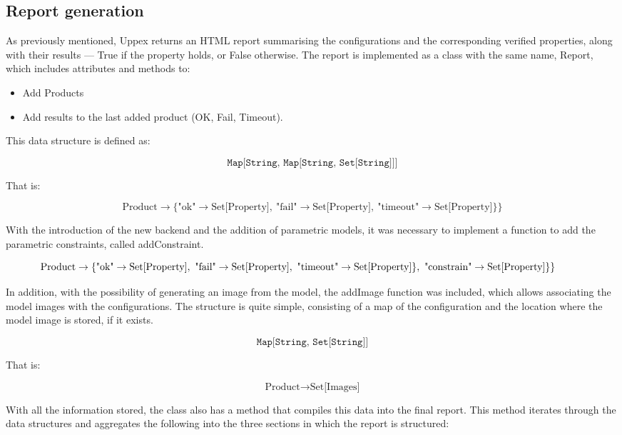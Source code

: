 \subsection{Report generation}

As previously mentioned, Uppex returns an HTML report summarising the configurations and the corresponding verified properties, along with their results — True if the property holds, or False otherwise. The report is implemented as a class with the same name, Report, which includes attributes and methods to:

\begin{itemize}
    \item Add Products

    \item Add results to the last added product (OK, Fail, Timeout).
\end{itemize}

This data structure is defined as:

\[
\texttt{Map[String, Map[String, Set[String]]]}
\]

That is:

\[
\text{Product} \rightarrow \{\text{"ok"} \rightarrow \text{Set[Property]}, \ \text{"fail"} \rightarrow \text{Set[Property]}, \ \text{"timeout"} \rightarrow \text{Set[Property]}\}\}
\]

With the introduction of the new backend and the addition of parametric models, it was necessary to implement a function to add the parametric constraints, called addConstraint.

\[
\hspace{-1cm}
\text{Product} \rightarrow \{\text{"ok"} \rightarrow \text{Set[Property]}, \ \text{"fail"} \rightarrow \text{Set[Property]}, \ \text{"timeout"} \rightarrow \text{Set[Property]}\}, \ \text{"constrain"} \rightarrow \text{Set[Property]}\}\}
\]

In addition, with the possibility of generating an image from the model, the addImage function was included, which allows associating the model images with the configurations. The structure is quite simple, consisting of a map of the configuration and the location where the model image is stored, if it exists.


\[
\texttt{Map[String, Set[String]]}
\]

That is:

\[
\text{Product} \rightarrow \text{Set[Images]}
\]

With all the information stored, the class also has a method that compiles this data into the final report. This method iterates through the data structures and aggregates the following into the three sections in which the report is structured:

